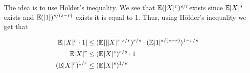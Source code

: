 
The idea is to use Hölder's inequality. We see that $ \mathbb{E} (|X|^{r} )^{s/r} $exists since $ \mathbb{E}
|X|^{s} $ exists and $ \mathbb{E} (|1|)^{s/(s-r)} $ exists it is equal to 1. Thus, using Hölder's
inequality we get that

\begin{align*}
    \mathbb{E} ||X|^{r} \cdot 1| &\leq (\mathbb{E}| ||X|^{r} |^{s/r})^{r/s} \cdot (\mathbb{E} |1|^{s/(s-r)} )^{1-r/s}   \\ 
    \mathbb{E} |X|^{r} &\leq (\mathbb{E} |X|^{s})^{r/s} \cdot 1\\ 
    (\mathbb{E} |X|^{r})^{1/r} &\leq (\mathbb{E} |X|^{s} )^{1/s}  
\end{align*}

